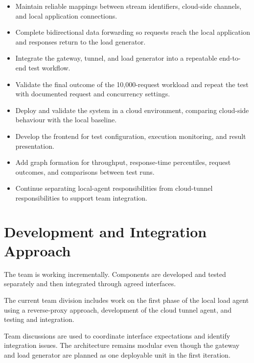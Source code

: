 \documentclass[11pt,a4paper,oneside]{report}
\begin{document}
\begin{itemize}
  \item Maintain reliable mappings between stream identifiers,
  cloud-side channels, and local application connections.

  \item Complete bidirectional data forwarding so requests
  reach the local application and responses return to the
  load generator.

  \item Integrate the gateway, tunnel, and load generator into
  a repeatable end-to-end test workflow.

  \item Validate the final outcome of the 10,000-request workload
  and repeat the test with documented request and concurrency settings.

  \item Deploy and validate the system in a cloud environment,
  comparing cloud-side behaviour with the local baseline.

  \item Develop the frontend for test configuration, execution
  monitoring, and result presentation.

  \item Add graph formation for throughput, response-time percentiles,
  request outcomes, and comparisons between test runs.

  \item Continue separating local-agent responsibilities from
  cloud-tunnel responsibilities to support team integration.
\end{itemize}

\section{Development and Integration Approach}

The team is working incrementally. Components are developed
and tested separately and then integrated through agreed
interfaces.

The current team division includes work on the first phase
of the local load agent using a reverse-proxy approach,
development of the cloud tunnel agent, and testing and
integration.

Team discussions are used to coordinate interface
expectations and identify integration issues. The architecture
remains modular even though the gateway and load generator
are planned as one deployable unit in the first iteration.
\end{document}
